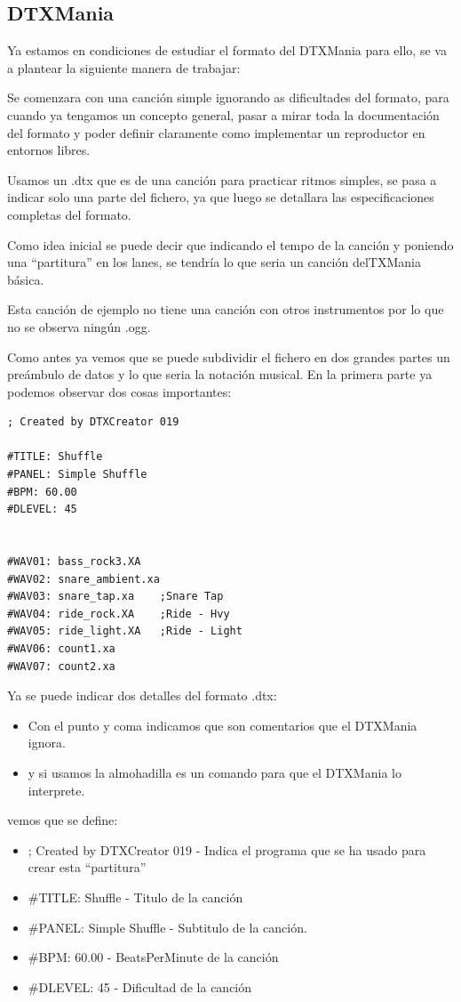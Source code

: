 \documentclass[a4paper,11pt,oneside]{book}
\begin{document}
\subsection{DTXMania}
Ya estamos en condiciones de estudiar el formato del DTXMania para ello, se va a plantear la siguiente manera de trabajar:

Se comenzara con una canción simple ignorando as dificultades del formato, para cuando ya tengamos un concepto general, pasar a mirar toda la documentación del formato y poder definir claramente como implementar un reproductor en entornos libres.

Usamos un .dtx que es de una canción para practicar ritmos simples, se pasa a indicar solo una parte del fichero, ya que luego se detallara las especificaciones completas del formato.

Como idea inicial  se puede decir que indicando el tempo de la canción y poniendo una ``partitura'' en los lanes, se tendría lo que seria un canción delTXMania básica.

Esta canción de ejemplo no tiene una canción con otros instrumentos por lo que no se observa ningún .ogg.

Como antes ya vemos que se puede subdividir el fichero en dos grandes partes un preámbulo de datos y lo que seria la notación musical.
En la primera parte ya podemos observar dos cosas importantes:

\begin{Verbatim}[frame=single]
; Created by DTXCreator 019

#TITLE: Shuffle
#PANEL: Simple Shuffle
#BPM: 60.00
#DLEVEL: 45


#WAV01: bass_rock3.XA
#WAV02: snare_ambient.xa
#WAV03: snare_tap.xa	;Snare Tap
#WAV04: ride_rock.XA	;Ride - Hvy
#WAV05: ride_light.XA	;Ride - Light
#WAV06: count1.xa
#WAV07: count2.xa
\end{Verbatim}

Ya se puede indicar dos detalles del formato .dtx:

\begin{itemize}
\item Con el punto y coma indicamos que son comentarios que el DTXMania ignora.
\item y si usamos la almohadilla es un comando para que el DTXMania lo interprete.
\end{itemize}

vemos que se define:


\begin{itemize}
\item ; Created by DTXCreator 019  - Indica el programa que se ha usado para crear esta ``partitura''
\item \#TITLE: Shuffle - Titulo de la canción
\item \#PANEL: Simple Shuffle - Subtitulo de la canción.
\item \#BPM: 60.00 - BeatsPerMinute de la canción
\item \#DLEVEL: 45 - Dificultad de la canción
\end{itemize}
\end{document}
